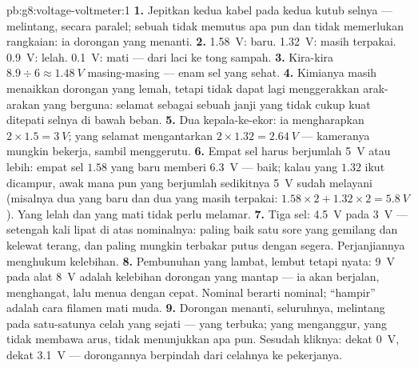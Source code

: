 \begin{solution}{pb:g8:voltage-voltmeter:1}
\textbf{1.} Jepitkan kedua kabel  pada kedua kutub selnya
--- melintang, secara paralel; sebuah  tidak memutus apa pun
dan tidak memerlukan rangkaian: ia  dorongan yang menanti.
\textbf{2.} \qty{1.58}{V}: baru. \qty{1.32}{V}: masih terpakai.
\qty{0.9}{V}: lelah. \qty{0.1}{V}: mati --- dari laci ke tong sampah.
\textbf{3.} Kira-kira $8.9 \div 6 \approx \qty{1.48}{V}$
masing-masing --- enam sel yang sehat.
\textbf{4.} Kimianya masih menaikkan dorongan yang lemah, tetapi tidak
dapat lagi menggerakkan arak-arakan yang berguna:  selamat
sebagai sebuah janji yang tidak cukup kuat ditepati selnya di bawah
beban.
\textbf{5.} Dua kepala-ke-ekor: ia mengharapkan $2 \times 1.5 =
\qty{3}{V}$; yang selamat mengantarkan $2 \times 1.32 =
\qty{2.64}{V}$ --- kameranya mungkin bekerja, sambil menggerutu.
\textbf{6.} Empat sel harus berjumlah \qty{5}{V} atau lebih: empat
sel $1.58$ yang baru memberi \qty{6.3}{V} --- baik; kalau yang
$1.32$ ikut dicampur, awak mana pun yang berjumlah sedikitnya
\qty{5}{V} sudah melayani (misalnya dua yang baru dan dua yang masih
terpakai: $1.58 \times 2 + 1.32 \times 2 =
\qty{5.8}{V}$). Yang lelah dan yang mati tidak perlu melamar.
\textbf{7.} Tiga sel: \qty{4.5}{V} pada  \qty{3}{V}
--- setengah kali lipat di atas nominalnya: paling baik satu sore
yang gemilang dan kelewat terang, dan paling mungkin terbakar putus
dengan segera. Perjanjiannya menghukum kelebihan.
\textbf{8.} Pembunuhan yang lambat, lembut tetapi nyata: \qty{9}{V}
pada alat \qty{8}{V} adalah kelebihan dorongan yang mantap --- ia akan
berjalan, menghangat, lalu menua dengan cepat. Nominal berarti
nominal; ``hampir'' adalah cara filamen mati muda.
\textbf{9.} Dorongan  menanti, seluruhnya, melintang pada
satu-satunya celah yang sejati ---  yang terbuka;  yang
menganggur, yang tidak membawa arus, tidak menunjukkan apa pun.
Sesudah  kliknya:  dekat \qty{0}{V},  dekat
\qty{3.1}{V} --- dorongannya berpindah dari celahnya ke pekerjanya.

\end{solution}
